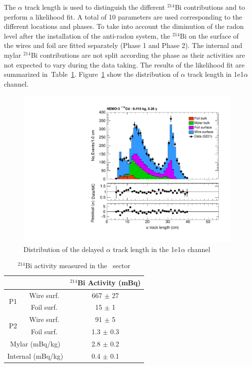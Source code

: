 \documentclass[main.tex]{subfiles}
\begin{document}
\bigskip


\NI The $\alpha$ track length is used to distinguish the different $^{\text{214}}$Bi contributions and to perform a likelihood fit. A total of 10 parameters are used corresponding to the different locations and phases. To take into account the diminution of the radon level after the installation of the anti-radon system, the $^{\text{214}}$Bi on the surface of the wires and foil are fitted separately (Phase 1 and Phase 2). The internal and mylar $^{\text{214}}$Bi contributions are not split according the phase as their activities are not expected to vary during the data taking. The results of the likelihood fit are summarized in~Table~\ref{Table1e1a-activityMeasurement}. Figure~\ref{1e1aChannel_alpphaLength} show the distribution of $\alpha$ track length in 1e1$\alpha$ channel.


\begin{figure}[h!]
\centering
\includegraphics[page=1,scale=0.55]{pictures/Chap6/FinalPlots.pdf}
\caption{Distribution of the delayed $\alpha$ track length in the 1e1$\alpha$ channel}
\label{1e1aChannel_alpphaLength}
\end{figure}





\begin{table}
\centering
\begin{tabular}{cc|c}
                    &            &  $^{\text{214}}$Bi Activity (mBq) \\
\midrule
\multirow{2}{*}{P1} & Wire surf. & 667 $\pm$ 27 \\ 
                    & Foil surf. & 15 $\pm$ 1 \\
\midrule
\multirow{2}{*}{P2} & Wire surf. & 91 $\pm$ 5 \\ 
                    & Foil surf. & 1.3 $\pm$ 0.3 \\
\midrule
\multicolumn{2}{c|}{Mylar (mBq/kg)}  & 2.8 $\pm$ 0.2 \\
\midrule
\multicolumn{2}{c|}{Internal (mBq/kg)}  & 0.4 $\pm$ 0.1 \\
\bottomrule
\end{tabular}
\caption{$^{\text{214}}$Bi  activity measured in the \Cd~sector}
\label{Table1e1a-activityMeasurement}
\end{table}
\end{document}

